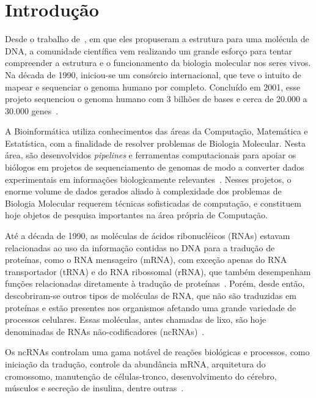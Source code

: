 \chapter{Introdução}

Desde o trabalho de~\cite{watson1953molecular:1953}, em que eles propuseram a estrutura para uma molécula de DNA, a comunidade científica vem realizando um grande esforço para tentar compreender a estrutura e o funcionamento da biologia molecular nos seres vivos. Na década de 1990, iniciou-se um consórcio internacional, que teve o intuito de mapear e sequenciar o genoma humano por completo. Concluído em 2001, esse projeto sequenciou o genoma humano com 3 bilhões de bases e cerca de 20.000 a 30.000 genes~\citep{venter2001sequence:2001,lander2001initial:2001,setubal1997introduction:1997}.

A Bioinformática utiliza conhecimentos das áreas da Computação, Matemática e Estatística,  com a finalidade de resolver problemas de Biologia Molecular. Nesta área, são desenvolvidos \textit{pipelines} e ferramentas computacionais para apoiar os bi\'ologos em projetos de sequenciamento de genomas de modo a converter dados experimentais em informações biologicamente relevantes~\citep{Schneider2006:2006,Schneider2010:2010,Ralha2011:2011}. Nesses projetos, o enorme volume de dados gerados aliado \`a complexidade dos problemas de Biologia Molecular requerem t\'ecnicas sofisticadas de computa\c{c}\~ao, e constituem hoje objetos de pesquisa importantes na área própria de Computação.

Até a década de 1990, as moléculas de ácidos ribonucléicos (RNAs) estavam relacionadas ao uso da informação contidas no DNA para a tradução de proteínas, como o RNA mensageiro (mRNA), com exceção apenas do RNA transportador (tRNA) e do RNA ribossomal (rRNA), que também desempenham funções relacionadas diretamente à tradução de proteínas~\citep{setubal1997introduction:1997}. Porém, desde então, descobriram-se outros tipos de moléculas de RNA, que não são traduzidas em proteínas e estão presentes nos organismos afetando uma grande variedade de processos celulares. Essas moléculas, antes chamadas de lixo, são hoje denominadas de RNAs não-codificadores (ncRNAs)~\citep{liu2005noncode:2005}.

Os ncRNAs controlam uma gama notável de reações biológicas e processos, como iniciação da tradução, controle da abundância mRNA, arquitetura do cromossomo, manutenção de células-tronco, desenvolvimento do cérebro, músculos e secreção de insulina, dentre outras~\citep{michalak2006rna:2006}.

